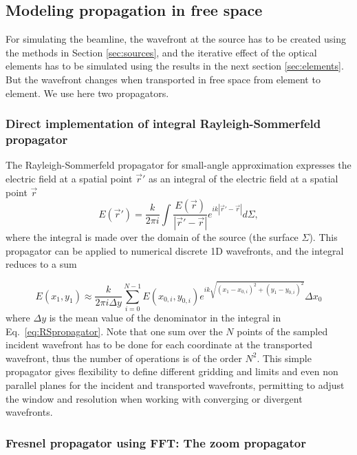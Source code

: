 \documentclass{iucr}              %
\begin{document}
\subsection{Modeling propagation in free space}
\label{sec:propagation}

For simulating the beamline, the wavefront at the source has to be created using the methods in Section \ref{sec:sources}, and the iterative effect of the optical elements has to be simulated using the results in the next section \ref{sec:elements}. But the wavefront changes when transported in free space from element to element. We use here two propagators. 

\subsubsection{Direct implementation of integral Rayleigh-Sommerfeld propagator}
\label{sec:integralPropagator}
%
The Rayleigh-Sommerfeld propagator for small-angle approximation expresses the electric field at a spatial point $\vec{r}'$ as an integral of the electric field at a spatial point $\vec{r}$ \cite{goodmanfourier}
\begin{equation}\label{eq:RSpropagator}
E(\vec{r}') =  \frac{k}{2 \pi i} \int \frac{E(\vec{r})}{|\vec{r}'-\vec{r}|} e^{ i k |\vec{r}' - \vec{r}|  }  d\Sigma,
\end{equation}
where the integral is made over the domain of the source (the surface $\Sigma$). 
This propagator can be applied to numerical discrete 1D wavefronts, and the integral reduces to a sum


\begin{equation}\label{eq:discreteRSpropagator}
E(x_1,y_1) \approx \frac{k}{2 \pi i \Delta y}  \sum_{i=0}^{N-1}  E(x_{0,i},y_{0,i}) e^{i k \sqrt{(x_1 - x_{0,i})^2 + (y_1 - y_{0,i})^2} }  \Delta x_0
\end{equation}
where $\Delta y$ is the mean value of the denominator in the integral in Eq.~\ref{eq:RSpropagator}.
Note that one sum over the $N$ points of the sampled incident wavefront has to be done for each coordinate at the transported wavefront, thus the number of operations is of the order $N^2$. This simple propagator gives flexibility to define different gridding and limits and even non parallel planes for the incident and transported wavefronts, permitting to adjust the window and resolution when working with converging or divergent wavefronts. 


\subsubsection{Fresnel propagator using FFT: The zoom propagator}
\label{sec:zoomPropagator}
\end{document}
